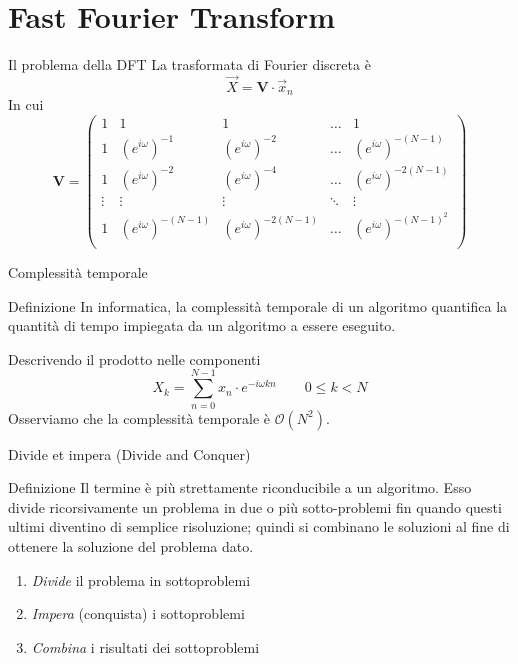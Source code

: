 \documentclass[10pt, xetex, handout]{beamer}
\begin{document}
\section{Fast Fourier Transform}
\begin{frame}{Il problema della DFT}
    La trasformata di Fourier discreta \`e
    \[
        \vec{X} = \mathbf{V}\cdot\vec{x}_n
    \]
    In cui
    \[
        \mathbf{V} = 
        \begin{pmatrix}
        1      & 1                      & 1                       & \dots  & 1                        \\[1em]
        1      & (e^{i\omega})^{-1}     & (e^{i\omega})^{-2}      & \dots  & (e^{i\omega})^{-(N-1)}   \\[1em]
        1      & (e^{i\omega})^{-2}     & (e^{i\omega})^{-4}      & \dots  & (e^{i\omega})^{-2(N-1)}  \\[1em]
        \vdots & \vdots                 &  \vdots                 & \ddots & \vdots                   \\[1em]
        1      & (e^{i\omega})^{-(N-1)} & (e^{i\omega})^{-2(N-1)} & \dots  & (e^{i\omega})^{-(N-1)^2} \\[1em]
        \end{pmatrix}
    \]
\end{frame}


\begin{frame}{Complessit\`a temporale}
    \begin{block}{Definizione}
        In informatica, la complessità temporale di un algoritmo quantifica la
        quantità di tempo impiegata da un algoritmo a essere eseguito.
    \end{block}
    Descrivendo il prodotto nelle componenti
    \[
        X_k = \sum_{n=0}^{N-1} x_n\cdot e^{-i\omega kn}
        \qquad 0 \leq k < N
    \]
    Osserviamo che la complessit\`a temporale \`e \(\mathcal{O}(N^2)\).
\end{frame}

\begin{frame}{Divide et impera (Divide and Conquer)}
    \begin{block}{Definizione}
        Il termine è più strettamente riconducibile a un algoritmo. Esso
        divide ricorsivamente un problema in due o più sotto-problemi fin
        quando questi ultimi diventino di semplice risoluzione; quindi si
        combinano le soluzioni al fine di ottenere la soluzione del problema
        dato. 
    \end{block}
    \begin{enumerate}
        \item \emph{Divide} il problema in sottoproblemi
        \item \emph{Impera} (conquista) i sottoproblemi
        \item \emph{Combina} i risultati dei sottoproblemi
    \end{enumerate}
\end{frame}
\end{document}
